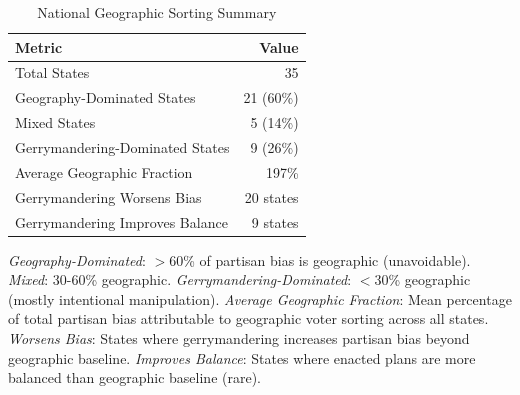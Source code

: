 \begin{table}[t]
\centering
\caption{National Geographic Sorting Summary}
\label{tab:geographic_sorting_summary}
\begin{tabular}{lr}
\toprule
\textbf{Metric} & \textbf{Value} \\
\midrule
Total States & 35 \\
\midrule
Geography-Dominated States & 21 (60\%) \\
Mixed States & 5 (14\%) \\
Gerrymandering-Dominated States & 9 (26\%) \\
\midrule
Average Geographic Fraction & 197\% \\
\midrule
Gerrymandering Worsens Bias & 20 states \\
Gerrymandering Improves Balance & 9 states \\
\bottomrule
\end{tabular}
\begin{tablenotes}
\small
\item \textit{Geography-Dominated}: $>$60\% of partisan bias is geographic (unavoidable). \textit{Mixed}: 30-60\% geographic. \textit{Gerrymandering-Dominated}: $<$30\% geographic (mostly intentional manipulation). \textit{Average Geographic Fraction}: Mean percentage of total partisan bias attributable to geographic voter sorting across all states. \textit{Worsens Bias}: States where gerrymandering increases partisan bias beyond geographic baseline. \textit{Improves Balance}: States where enacted plans are more balanced than geographic baseline (rare).
\end{tablenotes}
\end{table}
